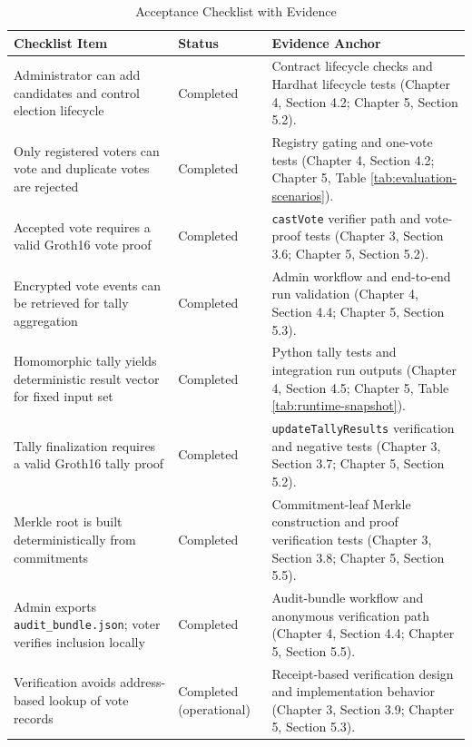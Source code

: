 \begin{table}[htbp]
\centering
\small
\caption{Acceptance Checklist with Evidence}
\label{tab:acceptance-checklist}
\begin{tabular}{L{5.0cm} L{2.1cm} L{4.9cm}}
\toprule
Checklist Item & Status & Evidence Anchor \\
\midrule
Administrator can add candidates and control election lifecycle & Completed & Contract lifecycle checks and Hardhat lifecycle tests (Chapter 4, Section 4.2; Chapter 5, Section 5.2). \\
Only registered voters can vote and duplicate votes are rejected & Completed & Registry gating and one-vote tests (Chapter 4, Section 4.2; Chapter 5, Table \ref{tab:evaluation-scenarios}). \\
Accepted vote requires a valid Groth16 vote proof & Completed & \texttt{castVote} verifier path and vote-proof tests (Chapter 3, Section 3.6; Chapter 5, Section 5.2). \\
Encrypted vote events can be retrieved for tally aggregation & Completed & Admin workflow and end-to-end run validation (Chapter 4, Section 4.4; Chapter 5, Section 5.3). \\
Homomorphic tally yields deterministic result vector for fixed input set & Completed & Python tally tests and integration run outputs (Chapter 4, Section 4.5; Chapter 5, Table \ref{tab:runtime-snapshot}). \\
Tally finalization requires a valid Groth16 tally proof & Completed & \texttt{updateTallyResults} verification and negative tests (Chapter 3, Section 3.7; Chapter 5, Section 5.2). \\
Merkle root is built deterministically from commitments & Completed & Commitment-leaf Merkle construction and proof verification tests (Chapter 3, Section 3.8; Chapter 5, Section 5.5). \\
Admin exports \texttt{audit\_bundle.json}; voter verifies inclusion locally & Completed & Audit-bundle workflow and anonymous verification path (Chapter 4, Section 4.4; Chapter 5, Section 5.5). \\
Verification avoids address-based lookup of vote records & Completed (operational) & Receipt-based verification design and implementation behavior (Chapter 3, Section 3.9; Chapter 5, Section 5.3). \\
\bottomrule
\end{tabular}
\end{table}

